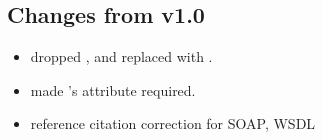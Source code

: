 \documentclass[11pt,a4paper]{ivoa}
\begin{document}
\subsection{Changes from v1.0}
\begin{itemize}
  \item dropped ,  and replaced
       with .
  \item made 's  attribute
       required.
  \item reference citation correction for SOAP, WSDL
\end{itemize}




\end{document}
